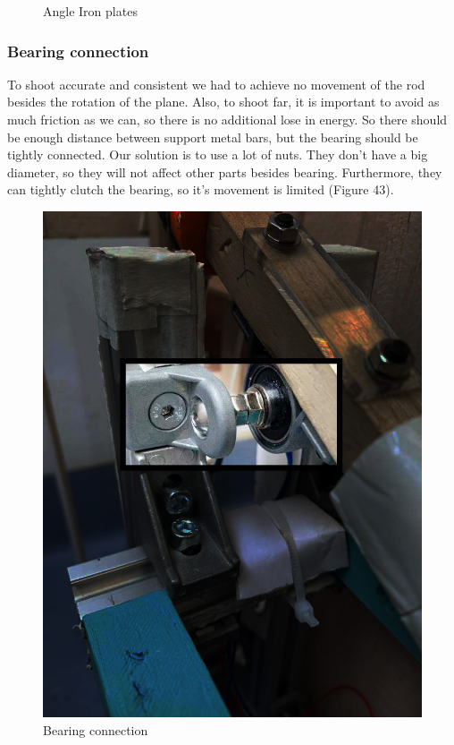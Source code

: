 \documentclass{article}
\begin{document}
\begin{figure}[H]
\centering
{}
\caption{Angle Iron plates}
\end{figure}

\subsubsection*{Bearing connection}
To shoot accurate and consistent we had to achieve no movement of the rod besides the rotation of the plane. Also, to shoot far, it is important to avoid as much friction as we can, so there is no additional lose in energy. So there should be enough distance between support metal bars, but the bearing should be tightly connected. Our solution is to use a lot of nuts. They don't have a big diameter, so they will not affect other parts besides bearing. Furthermore, they can tightly clutch the bearing, so it's movement is limited (Figure 43).

\begin{figure}[H]
\centering
\includegraphics[width=0.3\linewidth]{11}
\caption{Bearing connection}
\end{figure}
\end{document}
